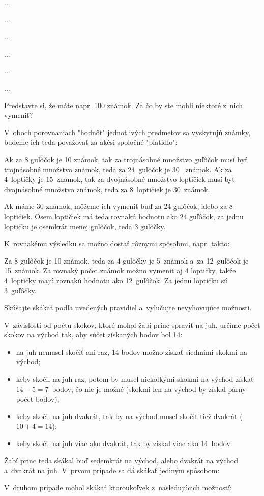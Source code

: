 ﻿{%
...}

{%
...}

{%
...}

{%
...}

{%
...}

{%
...}

{%
\napad
Predstavte si, že máte napr. 100 známok. Za čo by ste mohli niektoré z~nich vymeniť?

\riesenie
V~oboch porovnaniach "hodnôt" jednotlivých predmetov sa vyskytujú známky,
budeme ich teda považovať za akési spoločné "platidlo":

Ak za 8 guľôčok je 10 známok, tak za trojnásobné množstvo
guľôčok musí byť trojnásobné množstvo známok, teda za 24~guľôčok je 30~
známok. Ak za 4~loptičky je 15~známok, tak za dvojnásobné množstvo
loptičiek musí byť dvojnásobné množstvo známok, teda za 8~loptičiek je 30~známok.

Ak máme 30 známok, môžeme ich vymeniť buď za 24 guľôčok, alebo za 8 loptičiek.
Osem loptičiek má teda rovnakú hodnotu ako 24 guľôčok,
za jednu loptičku je osemkrát menej guľôčok, teda 3 guľôčky.

\poznamka
K~rovnakému výsledku sa možno dostať rôznymi spôsobmi, napr. takto:

Za 8 guľôčok je 10 známok, teda za 4 guľôčky je 5~známok  a~za 12~guľôčok je
15~známok.
Za rovnaký počet známok možno vymeniť aj 4 loptičky, takže 4~loptičky majú rovnakú
hodnotu ako 12~guľôčok.
Za jednu loptičku sú 3~guľôčky.
}

{%
\napad
Skúšajte skákať podľa uvedených pravidiel a~vylučujte nevyhovujúce možnosti.

\riesenie
V~závislosti od počtu skokov, ktoré mohol žabí princ spraviť na juh, určíme
počet skokov na východ tak, aby súčet získaných bodov bol 14:
\begin{itemize}
\item na juh nemusel skočiť ani raz, 14 bodov možno získať siedmimi skokmi na
východ;
\item keby skočil na juh raz, potom by musel niekoľkými skokmi na východ
získať ${14-5}=7$~bodov, čo nie je možné (skokmi len na východ by získal
párny počet bodov);
\item keby skočil na juh dvakrát, tak by na východ musel skočiť tiež dvakrát
($10+4=14$);
\item keby skočil na juh viac ako dvakrát, tak by získal viac ako 14~bodov.
\end{itemize}

Žabí princ teda skákal buď sedemkrát na východ, alebo dvakrát na východ
a~dvakrát na juh. V~prvom prípade sa dá skákať jediným spôsobom:
%

V~druhom prípade mohol skákať ktoroukoľvek z~nasledujúcich možností:
%
}

